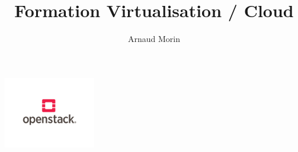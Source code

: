 \usepackage[utf8]{inputenc}
\usepackage{graphicx}
\usepackage{xparse}
\usepackage{microtype}
\usepackage{verbatim}
\usepackage[french]{babel}


\title{Formation Virtualisation / Cloud}
\author{Arnaud Morin}
\date{}





  \begin{frame}
    \titlepage
    \begin{center}
      \includegraphics[width=4cm]{images/openstack.png}
    \end{center}
  \end{frame}

